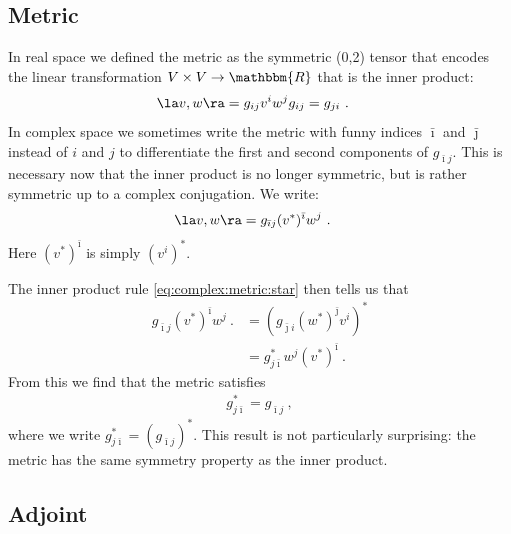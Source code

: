 \subsection{Metric}
In real space we defined the metric as the symmetric (0,2) tensor that encodes the linear transformation $V\times V \to \mathbbm{R}$ that is the inner product:
\begin{align}
    \la v , w \ra = g_{ij}v^i w^j 
    &
    g_{ij} = g_{ji}
    \ .
\end{align}
In complex space we sometimes write the metric with funny indices $\bar{\imath}$ and $\bar{\jmath}$ instead of $i$ and $j$ to differentiate the first and second components of $g_{\bar{\imath}j}$. This is necessary now that the inner product is no longer symmetric, but is rather symmetric up to a complex conjugation. We write:
\begin{align}
    \la v, w \ra &= g_{\bar{\imath}j}(v^*)^{\bar{\imath}}w^j \ .
\end{align}
Here $(v^*)^{\bar{\imath}}$ is simply $(v^i)^*$.

The inner product rule \eqref{eq:complex:metric:star} then tells us that
\begin{align}
    g_{\bar{\imath}j}(v^*)^{\bar{\imath}}w^j \ .
    &= 
    \left(
        g_{\bar{\jmath}i}
        (w^*)^{\bar{\jmath}}
        v^i
        \right)^*
    \\
    &= 
    g_{j\bar{\imath}}^* w^j(v^*)^{\bar{\imath}}
     \ .
\end{align}
From this we find that the metric satisfies
\begin{align}
g_{j\bar{\imath}}^* =
    g_{\bar{\imath}j} \ ,
\end{align}
where we write $g_{j\bar{\imath}}^* = (g_{\bar\imath j})^*$.  This result is not particularly surprising: the metric has the same symmetry property as the inner product. 


\subsection{Adjoint}


